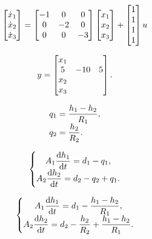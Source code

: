 \documentclass{article}
\begin{document}
\[
$$
\left[ \begin{matrix} {\dot{x}_{1}} \\ {\dot{x}_{2}} \\ {\dot{x}_{3}} \\ \end{matrix} \right]=\left[ \begin{matrix} {-1} & {0} & {0} \\ {0} & {-2} & {0} \\ {0} & {0} & {-3} \\ \end{matrix} \right] \left[ \begin{matrix} {x_{1}} \\ {x_{2}} \\ {x_{3}} \\ \end{matrix} \right]+\left[ \begin{matrix} {1} \\ {1} \\ {1} \\ {1} \\ \end{matrix} \right] u
$$
\]

\[
$$
y=\left[ \begin{matrix} {x_{1}} \\ {5} & {-1 0} & {5} \\ {x_{2}} \\ {x_{3}} \\ \end{matrix} \right].
$$
\]

\[
$$
\begin{array} {l} {q_{1}=\displaystyle\frac{h_{1}-h_{2}} {R_{1}},} \\ {\displaystyle q_{2}=\displaystyle\frac{h_{2}} {R_{2}}.} \\ \end{array}
$$
\]

\[
$$
\left\{\begin{matrix} A_{1} \displaystyle\frac{\mathrm{d} h_{1}} {\mathrm{d} t}=d_{1}-q_{1}, \\ {A_{2} \displaystyle\frac{\mathrm{d} h_{2}} {\mathrm{d} t}=d_{2}-q_{2}+q_{1}.} \\ \end{matrix} \right.
$$
\]

\[
$$
\left\{\begin{matrix} {A_{1} \displaystyle\frac{\mathrm{d} h_{1}} {\mathrm{d} t}=d_{1}-\frac{h_{1}-h_{2}} {R_{1}},} \\ {A_{2} \displaystyle\frac{\mathrm{d} h_{2}} {\mathrm{d} t}=d_{2}-\frac{h_{2}} {R_{2}}+\frac{h_{1}-h_{2}} {R_{1}}.} \\ \end{matrix} \right.
$$
\]
\end{document}
